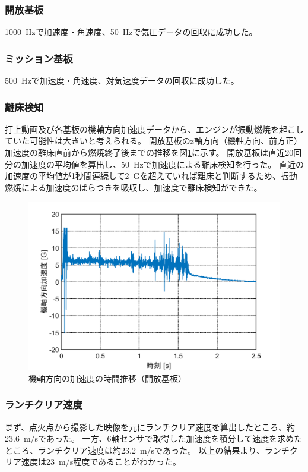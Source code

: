 \documentclass[a4paper,11pt,uplatex]{jsarticle}
\begin{document}
\subsubsection{開放基板}
\SI{1000}{Hz}で加速度・角速度、\SI{50}{Hz}で気圧データの回収に成功した。

\subsubsection{ミッション基板}
\SI{500}{Hz}で加速度・角速度、対気速度データの回収に成功した。

\subsubsection{離床検知}
打上動画及び各基板の機軸方向加速度データから、エンジンが振動燃焼を起こしていた可能性は大きいと考えられる。
開放基板のz軸方向（機軸方向、前方正）加速度の離床直前から燃焼終了後までの推移を図\ref{fig:az_data}に示す。
開放基板は直近20回分の加速度の平均値を算出し、\SI{50}{Hz}で加速度による離床検知を行った。
直近の加速度の平均値が1秒間連続して\SI{2}{G}を超えていれば離床と判断するため、振動燃焼による加速度のばらつきを吸収し、加速度で離床検知ができた。
\begin{figure}[H]
	\centering
	\includegraphics[width=0.8\linewidth]{pic_avi/59_6axis.png}
	\caption{機軸方向の加速度の時間推移（開放基板）}
	\label{fig:az_data}
\end{figure}

\subsubsection{ランチクリア速度}
まず、点火点から撮影した映像を元にランチクリア速度を算出したところ、約\SI{23.6}{m/s}であった。
一方、6軸センサで取得した加速度を積分して速度を求めたところ、ランチクリア速度は約\SI{23.2}{m/s}であった。
以上の結果より、ランチクリア速度は\SI{23}{m/s}程度であることがわかった。
\end{document}
